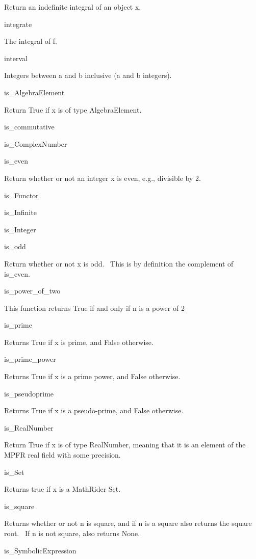 \documentclass[12pt,twoside]{book}
\begin{document}
Return an indefinite integral of an object x.

integrate \ \ \ \ 

The integral of f.

interval \ \ \ \ 

Integers between a and b inclusive (a and b integers).

is\_AlgebraElement

Return True if x is of type AlgebraElement.

is\_commutative


\bigskip

is\_ComplexNumber



is\_even

Return whether or not an integer x is even, e.g., divisible by 2.

is\_Functor 


\bigskip

is\_Infinite 


\bigskip

is\_Integer 


\bigskip

is\_odd 

Return whether or not x is odd. \ This is by definition the complement of is\_even.

is\_power\_of\_two

This function returns True if and only if n is a power of 2

is\_prime

Returns True if x is prime, and False otherwise.

is\_prime\_power \ \ \ \ 

Returns True if x is a prime power, and False otherwise.

is\_pseudoprime

Returns True if x is a pseudo{}-prime, and False otherwise.

is\_RealNumber

Return True if x is of type RealNumber, meaning that it is an element of the MPFR real field with some precision.

is\_Set

Returns true if x is a MathRider Set.

is\_square

Returns whether or not n is square, and if n is a square also returns the square root. \ If n is not square, also returns None.

is\_SymbolicExpression
\end{document}
